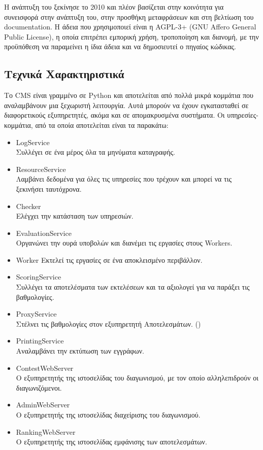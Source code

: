 \documentclass[diploma]{softlab-thesis}
\begin{document}
\bigskip

Η ανάπτυξη του ξεκίνησε το 2010 και πλέον βασίζεται στην κοινότητα για
συνεισφορά στην ανάπτυξη του, στην προσθήκη μεταφράσεων και στη βελτίωση του
documentation. H άδεια που χρησιμοποιεί είναι η AGPL-3+ (GNU Affero General
Public License), η οποία επιτρέπει εμπορική χρήση, τροποποίηση και διανομή, με
την προϋπόθεση να παραμείνει η ίδια άδεια και να δημοσιευτεί ο πηγαίος κώδικας.

\subsection{Τεχνικά Χαρακτηριστικά}

Το CMS είναι γραμμένο σε Python και αποτελείται από πολλά μικρά κομμάτια που
αναλαμβάνουν μια ξεχωριστή λειτουργία. Αυτά μπορούν να έχουν εγκατασταθεί σε
διαφορετικούς εξυπηρετητές, ακόμα και σε απομακρυσμένα συστήματα. Οι
υπηρεσίες-κομμάτια, από τα οποία αποτελείται είναι τα παρακάτω:

\begin{itemize}
    \setlength\itemsep{0em}
    \item LogService \\
      Συλλέγει σε ένα μέρος όλα τα μηνύματα καταγραφής.
    \item ResourceService \\
      Λαμβάνει δεδομένα για όλες τις υπηρεσίες που τρέχουν και μπορεί να τις
      ξεκινήσει ταυτόχρονα.
    \item Checker \\
      Ελέγχει την κατάσταση των υπηρεσιών.
    \item EvaluationService \\
      Οργανώνει την ουρά υποβολών και διανέμει τις εργασίες στους Workers.
    \item Worker
      Εκτελεί τις εργασίες σε ένα αποκλεισμένο περιβάλλον.
    \item ScoringService \\
      Συλλέγει τα αποτελέσματα των εκτελέσεων και τα αξιολογεί για να παράξει
      τις βαθμολογίες.
    \item ProxyService \\
      Στέλνει τις βαθμολογίες στον εξυπηρετητή Αποτελεσμάτων.
      (\cite{maggiolo2014cms})
    \item PrintingService \\
      Αναλαμβάνει την εκτύπωση των εγγράφων.
    \item ContestWebServer \\
      Ο εξυπηρετητής της ιστοσελίδας του διαγωνισμού, με τον οποίο αλληλεπιδρούν
      οι διαγωνιζόμενοι.
    \item AdminWebServer \\
      Ο εξυπηρετητής της ιστοσελίδας διαχείρισης του διαγωνισμού.
    \item RankingWebServer \\
      Ο εξυπηρετητής της ιστοσελίδας εμφάνισης των αποτελεσμάτων.
\end{itemize}
\end{document}

